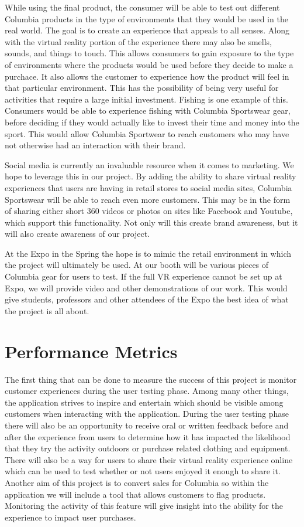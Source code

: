\documentclass[10pt, oneside,onecolumn,draftclsnofoot]{IEEEtran}
\begin{document}
While using the final product, the consumer will be able to test out different
Columbia products in the type of environments that they would be used in
the real world. The goal is to create an experience that appeals to all senses.
Along with the virtual reality portion of the experience there may also be
smells, sounds, and things to touch. This allows consumers to gain exposure to
the type of environments where the products would be used before they decide to
make a purchace. It also allows the customer to experience how the product will
feel in that particular environment. This has the possibility of being very
useful for activities that require a large initial investment. Fishing is one
example of this. Consumers would be able to experience fishing with Columbia
Sportswear gear, before deciding if they would actually like to invest their
time and money into the sport. This would allow Columbia Sportwear to reach
customers who may have not otherwise had an interaction with their brand.

Social media is currently an invaluable resource when it comes to marketing.
We hope to leverage this in our project. By adding the ability to share
virtual reality experiences that users are having in retail stores to social
media sites, Columbia Sportswear will be able to reach even more customers.
This may be in the form of sharing either short 360 videos or photos on sites
like Facebook and Youtube, which support this functionality. Not only will this
create brand awareness, but it will also create awareness of our project.

At the Expo in the Spring the hope is to mimic the retail environment in which
the project will ultimately be used. At our booth will be various pieces of
Columbia gear for users to test. If the full VR experience cannot be set up
at Expo, we will provide video and other demonstrations of our work. This would
give students, professors and other attendees of the Expo the best idea of
what the project is all about.

\section{Performance Metrics}
The first thing that can be done to measure the success of this project is
monitor customer experiences during the user testing phase. Among many other
things, the application strives to inspire and entertain which should be visible
among customers when interacting with the application. During the user testing
phase there will also be an opportunity to receive oral or written feedback
before and after the experience from users to determine how it has impacted the
likelihood that they try the activity outdoors or purchase related clothing and
equipment. There will also be a way for users to share their virtual reality
experience online which can be used to test whether or not users enjoyed it
enough to share it. Another aim of this project is to convert sales for Columbia
so within the application we will include a tool that allows customers to flag
products. Monitoring the activity of this feature will give insight into the
ability for the experience to impact user purchases.
\end{document}
